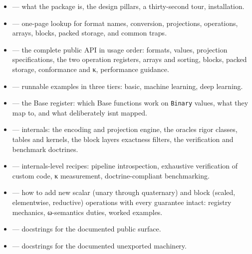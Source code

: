 \begin{itemize}
\item \textbf{} — what the package is, the design pillars, a thirty-second tour, installation.


\item \textbf{} — one-page lookup for format names, conversion, projections, operations, arrays, blocks, packed storage, and common traps.


\item \textbf{} — the complete public API in usage order: formats, values, projection specifications, the two operation registers, arrays and sorting, blocks, packed storage, conformance and κ, performance guidance.


\item \textbf{} — runnable examples in three tiers: basic, machine learning, deep learning.


\item \textbf{} — the Base register: which Base functions work on \texttt{Binary} values, what they map to, and what deliberately isn{\textquotesingle}t mapped.


\item \textbf{} — internals: the encoding and projection engine, the oracle{\textquotesingle}s rigor classes, tables and kernels, the block layer{\textquotesingle}s exactness filters, the verification and benchmark doctrines.


\item \textbf{} — internals-level recipes: pipeline introspection, exhaustive verification of custom code, κ measurement, doctrine-compliant benchmarking.


\item \textbf{} — how to add new scalar (unary through quaternary) and block (scaled, elementwise, reductive) operations with every guarantee intact: registry mechanics, ω-semantics duties, worked examples.


\item \textbf{} — docstrings for the documented public surface.


\item \textbf{} — docstrings for the documented unexported machinery.

\end{itemize}


